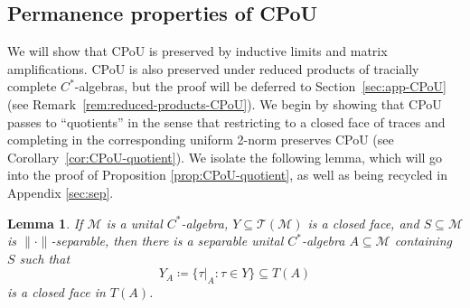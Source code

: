 \documentclass[a4paper,11pt]{amsart}
\newtheorem{lemma}[theorem]{Lemma}
\theoremstyle{definition}
\numberwithin{equation}{section}
\numberwithin{theorem}{section}
\begin{document}
\subsection{Permanence properties of CPoU}\label{sec:cpou-permanence}

We will show that CPoU is preserved by inductive limits and matrix amplifications.  CPoU is also preserved under reduced products of tracially complete $C^*$-algebras, but the proof will be deferred to Section~\ref{sec:app-CPoU} (see Remark~\ref{rem:reduced-products-CPoU}).  We begin by showing that CPoU passes to ``quotients'' in the sense that restricting to a closed face of traces and completing in the corresponding uniform 2-norm preserves CPoU (see Corollary~\ref{cor:CPoU-quotient}).  We isolate the following lemma, which will go into the proof of Proposition \ref{prop:CPoU-quotient}, as well as being recycled in Appendix \ref{sec:sep}.

\begin{lemma}\label{lem:separable-face}
	If $\mathcal M$ is a unital $C^*$-algebra, $Y \subseteq \mathcal T(\mathcal M)$ is a closed face, and $S \subseteq \mathcal M$ is $\|\cdot\|$-separable, then there is a separable unital $C^*$-algebra $A \subseteq \mathcal M$ containing $S$ such that 
	\begin{equation}\label{eq:separable-face}
		Y_A \coloneqq \{ \tau|_A : \tau \in Y \} \subseteq T(A)
	\end{equation}
	is a closed face in $T(A)$.
\end{lemma}
\end{document}

